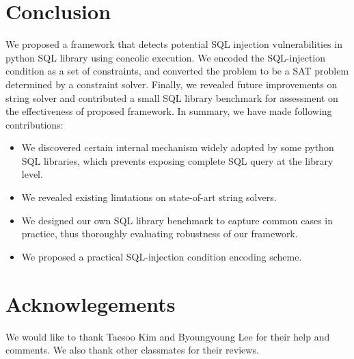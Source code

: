 \documentclass[conference]{IEEEtran}
\begin{document}
\section{Conclusion}
\label{conclusion}
We proposed a framework that detects potential SQL injection vulnerabilities in python SQL library using concolic execution. We encoded the SQL-injection condition as a set of constraints, and converted the problem to be a SAT problem determined by a constraint solver. Finally, we revealed future improvements on string solver and contributed a small SQL library benchmark for assessment on the effectiveness of proposed framework. In summary, we have made following contributions:
\begin{itemize}
\item We discovered certain internal mechanism widely adopted by some python SQL libraries, which prevents exposing complete SQL query at the library level.
\item We revealed existing limtations on state-of-art string solvers.
\item We designed our own SQL library benchmark to capture common cases in practice, thus thoroughly evaluating robustness of our framework.
\item We proposed a practical SQL-injection condition encoding scheme.
\end{itemize}

\section{Acknowlegements}
We would like to thank Taesoo Kim and Byoungyoung Lee for their help and comments. We also thank other classmates for their reviews.



\end{document}
